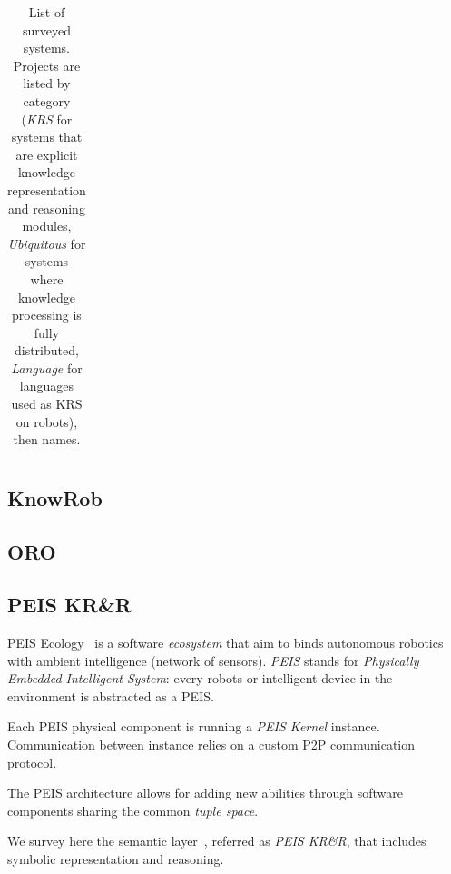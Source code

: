 \documentclass[a4paper, twocolumn]{article}
\begin{document}
\begin{landscape}
\begin{table}
\begin{center}
\begin{tabular}{p{2.2cm}p{1.6cm}p{4cm}lp{2.4cm}p{3.4cm}p{2.8cm}p{1.5cm}}
\bottomrule

\end{tabular}
\end{center}
\caption{List of surveyed systems. Projects are listed by category (\emph{KRS} for systems that are explicit knowledge representation and reasoning modules, \emph{Ubiquitous} for systems where knowledge processing is fully distributed, \emph{Language} for languages used as KRS on robots), then names.}
\label{table|surveyed-systems}
\end{table}
\end{landscape}


\subsection{KnowRob}
\label{sect|knowrob}

\subsection{ORO}
\label{sect|oro}

\subsection{PEIS KR\&R}
\label{sect|peis-ecology}


{\sc PEIS Ecology}~\cite{Saffiotti2005} is a software \emph{ecosystem} that aim to binds autonomous
robotics with ambient intelligence (network of sensors). \emph{PEIS} stands for
\emph{Physically Embedded Intelligent System}: every robots or intelligent
device in the environment is abstracted as a PEIS.

Each PEIS physical component is running a \emph{PEIS Kernel} instance. Communication
between instance relies on a custom P2P communication protocol.

The PEIS architecture allows for adding new abilities through software components sharing the common \emph{tuple space}.

We survey here the semantic layer~\cite{Daoutis2009}, referred as \emph{PEIS KR\&R}, that includes symbolic representation and reasoning.
\end{document}

